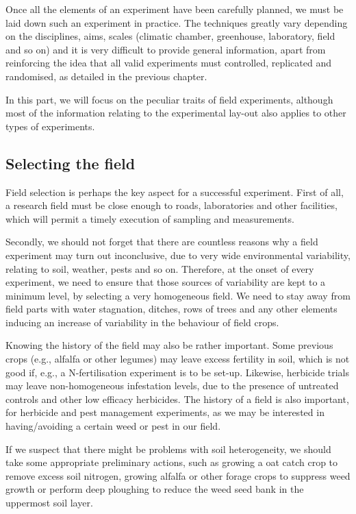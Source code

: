 \documentclass[a4paper,12pt,oneside]{book}
\begin{document}
Once all the elements of an experiment have been carefully planned, we must be laid down such an experiment in practice. The techniques greatly vary depending on the disciplines, aims, scales (climatic chamber, greenhouse, laboratory, field and so on) and it is very difficult to provide general information, apart from reinforcing the idea that all valid experiments must controlled, replicated and randomised, as detailed in the previous chapter.

In this part, we will focus on the peculiar traits of field experiments, although most of the information relating to the experimental lay-out also applies to other types of experiments.

\hypertarget{selecting-the-field}{%
\subsection{Selecting the field}\label{selecting-the-field}}

Field selection is perhaps the key aspect for a successful experiment. First of all, a research field must be close enough to roads, laboratories and other facilities, which will permit a timely execution of sampling and measurements.

Secondly, we should not forget that there are countless reasons why a field experiment may turn out inconclusive, due to very wide environmental variability, relating to soil, weather, pests and so on. Therefore, at the onset of every experiment, we need to ensure that those sources of variability are kept to a minimum level, by selecting a very homogeneous field. We need to stay away from field parts with water stagnation, ditches, rows of trees and any other elements inducing an increase of variability in the behaviour of field crops.

Knowing the history of the field may also be rather important. Some previous crops (e.g., alfalfa or other legumes) may leave excess fertility in soil, which is not good if, e.g., a N-fertilisation experiment is to be set-up. Likewise, herbicide trials may leave non-homogeneous infestation levels, due to the presence of untreated controls and other low efficacy herbicides. The history of a field is also important, for herbicide and pest management experiments, as we may be interested in having/avoiding a certain weed or pest in our field.

If we suspect that there might be problems with soil heterogeneity, we should take some appropriate preliminary actions, such as growing a oat catch crop to remove excess soil nitrogen, growing alfalfa or other forage crops to suppress weed growth or perform deep ploughing to reduce the weed seed bank in the uppermost soil layer.
\end{document}
